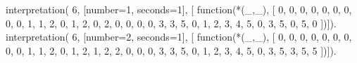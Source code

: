 interpretation( 6, [number=1, seconds=1], [
  function(*(_,_), [
     0, 0, 0, 0, 0, 0,
     0, 0, 0, 1, 1, 2,
     0, 1, 2, 0, 2, 0,
     0, 0, 0, 3, 3, 5,
     0, 1, 2, 3, 4, 5,
     0, 3, 5, 0, 5, 0 ])]).
interpretation( 6, [number=2, seconds=1], [
  function(*(_,_), [
     0, 0, 0, 0, 0, 0,
     0, 0, 0, 1, 1, 2,
     0, 1, 2, 1, 2, 2,
     0, 0, 0, 3, 3, 5,
     0, 1, 2, 3, 4, 5,
     0, 3, 5, 3, 5, 5 ])]).
